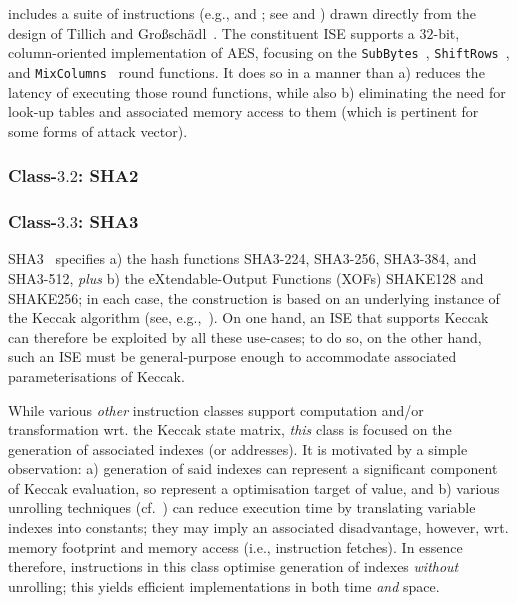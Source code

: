 \XCRYPTO includes a suite of instructions 
(e.g.,  and ; see  and )
drawn directly from the design of
Tillich and Gro{\ss}sch\"{a}dl~\cite{SCARV:TilGro:06}.
The constituent ISE supports a $32$-bit, column-oriented implementation 
of AES, focusing on the
{\tt SubBytes}~\cite[Section 5.1.1]{SCARV:FIPS:197},
{\tt ShiftRows}~\cite[Section 5.1.2]{SCARV:FIPS:197}, 
and
{\tt MixColumns}~\cite[Section 5.1.3]{SCARV:FIPS:197}
round functions.  It does so in a manner than 
a) reduces the latency of executing those round functions, 
   while also
b) eliminating the need for look-up tables and associated memory access
   to them (which is pertinent for some forms of attack vector).


\subsubsection{Class-$3.2$: SHA2}
\label{sec:bg:feature:3:2}



\subsubsection{Class-$3.3$: SHA3}
\label{sec:bg:feature:3:3}

SHA3~\cite{SCARV:FIPS:202}
specifies 
a) the hash functions SHA3-224, SHA3-256, SHA3-384, and SHA3-512,
   {\em plus}
b) the eXtendable-Output Functions (XOFs) SHAKE128 and SHAKE256;
in each case, the construction is based on an underlying instance of the
Keccak algorithm (see, e.g.,~\cite{SCARV:BDPA:13}).  On one hand, an ISE
that supports Keccak can therefore be exploited by all these use-cases;
to do so, on the other hand, such an ISE must be general-purpose enough
to accommodate associated parameterisations of Keccak.

While various {\em other} \XCRYPTO instruction classes support computation
and/or transformation wrt. the Keccak state matrix, {\em this} class is
focused on the generation of associated indexes (or addresses).  It is
motivated by a simple observation:
a) generation of said indexes can represent a significant component of
   Keccak evaluation, so represent a optimisation target of value,
   and
b) various unrolling techniques (cf.~\cite{SCARV:BDPAK:12}) can reduce 
   execution time by translating variable indexes into constants; they
   may imply an associated disadvantage, however, wrt. memory footprint
   and memory access (i.e., instruction fetches).
In essence therefore, instructions in this class optimise generation of
indexes {\em without} unrolling; this yields efficient implementations
in both time {\em and} space.

